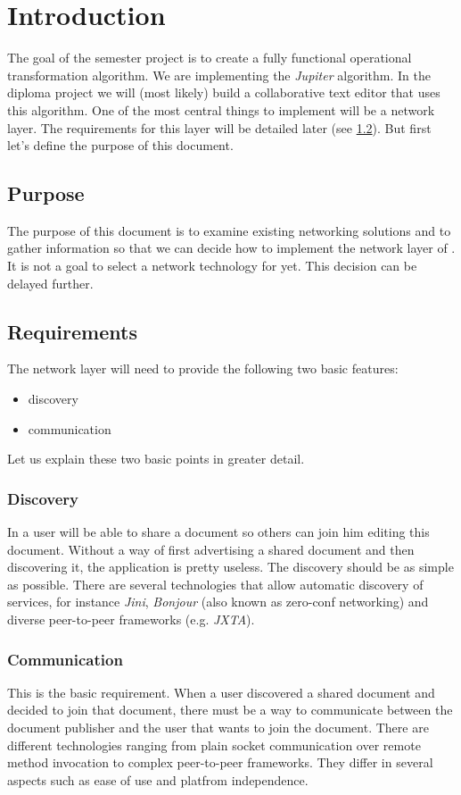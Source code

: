 \section{Introduction}
The goal of the semester project is to create a fully functional operational transformation algorithm. We are implementing the \emph{Jupiter} algorithm. In the diploma project we will (most likely) build a collaborative text editor that uses this algorithm. One of the most central things to implement will be a network layer. The requirements for this layer will be detailed later (see \ref{sect:requirements}). But first let's define the purpose of this document.

\subsection{Purpose}
The purpose of this document is to examine existing networking solutions and to gather information so that we can decide how to implement the network layer of \ace. It is not a goal to select a network technology for \ace yet. This decision can be delayed further. 

\subsection{Requirements}
\label{sect:requirements}
The network layer will need to provide the following two basic features:

\begin{itemize}
 \item discovery
 \item communication
\end{itemize}

Let us explain these two basic points in greater detail.

\subsubsection{Discovery}
In \ace a user will be able to share a document so others can join him editing this document. Without a way of first advertising a shared document and then discovering it, the application is pretty useless. The discovery should be as simple as possible. There are several technologies that allow automatic discovery of services, for instance \emph{Jini}, \emph{Bonjour} (also known as zero-conf networking) and diverse peer-to-peer frameworks (e.g. \emph{JXTA}).

\subsubsection{Communication}
This is the basic requirement. When a user discovered a shared document and decided to join that document, there must be a way to communicate between the document publisher and the user that wants to join the document. There are different technologies ranging from plain socket communication over remote method invocation to complex peer-to-peer frameworks. They differ in several aspects such as ease of use and platfrom independence.

